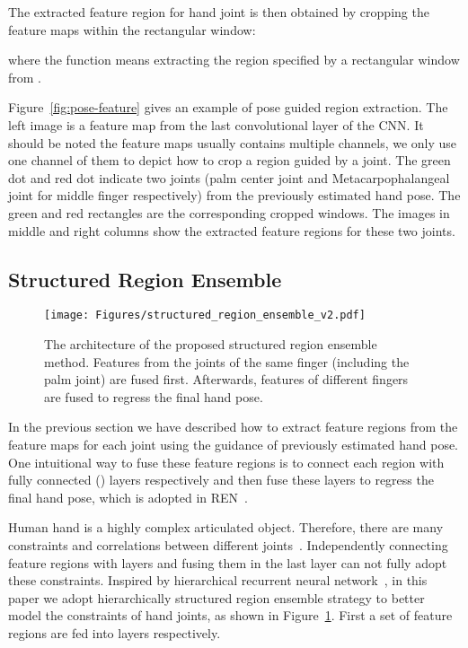 \documentclass[final, 5p]{elsarticle}
\begin{document}
The extracted feature region for hand joint  is then obtained by cropping the feature maps within the rectangular window:

where the function  means extracting the region specified by a rectangular window  from .

Figure~\ref{fig:pose-feature} gives an example of pose guided region extraction. The left image is a feature map from the last convolutional layer of the CNN. It should be noted the feature maps usually contains multiple channels, we only use one channel of them to depict how to crop a region guided by a joint. The green dot and red dot indicate two joints (palm center joint and Metacarpophalangeal joint for middle finger respectively) from the previously estimated hand pose. The green and red rectangles are the corresponding cropped windows. The images in middle and right columns show the extracted feature regions for these two joints.

\subsection{Structured Region Ensemble}
\label{sec:method-structure}
\begin{figure}[tb]
  \centering
    \centerline{\texttt{[image: Figures/structured\_region\_ensemble\_v2.pdf]}}
  \caption{The architecture of the proposed structured region ensemble method. Features from the joints of the same finger (including the palm joint) are fused first. Afterwards, features of different fingers are fused to regress the final hand pose.}
\label{fig:structure-region-ensemble}
\end{figure}

In the previous section we have described how to extract feature regions from the feature maps for each joint using the guidance of previously estimated hand pose. One intuitional way to fuse these feature regions is to connect each region with fully connected () layers respectively and then fuse these layers to regress the final hand pose, which is adopted in REN~\cite{guo2017region}.

Human hand is a highly complex articulated object. Therefore, there are many constraints and correlations between different joints~\cite{lin2000modeling, wu2001hand}. Independently connecting feature regions with  layers and fusing them in the last layer can not fully adopt these constraints. Inspired by hierarchical recurrent neural network~\cite{du2015hierarchical}, in this paper we adopt hierarchically structured region ensemble strategy to better model the constraints of hand joints, as shown in Figure~\ref{fig:structure-region-ensemble}. First a set of feature regions  are fed into  layers respectively.
\end{document}
